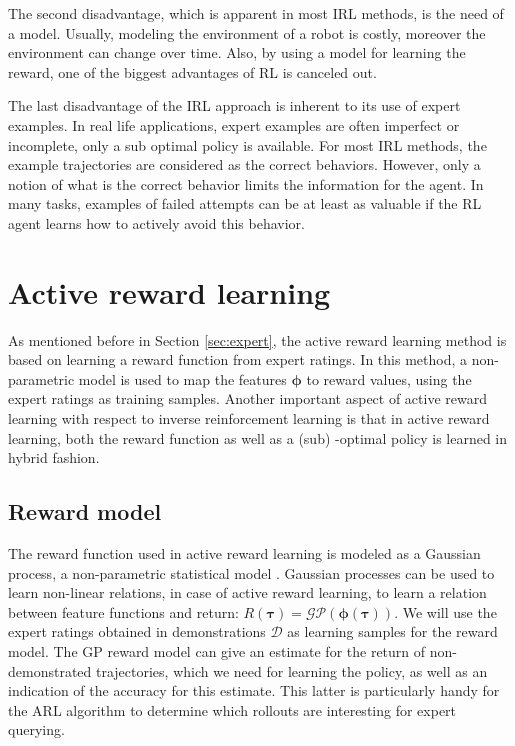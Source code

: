 \documentclass[mscThesis.tex]{subfiles}
\begin{document}
The second disadvantage, which is apparent in most IRL methods, is the need of a model. Usually, modeling the environment of a robot is costly, moreover the environment can change over time. Also, by using a model for learning the reward, one of the biggest advantages of RL is canceled out. 

The last disadvantage of the IRL approach is inherent to its use of expert examples. In real life applications, expert examples are often imperfect or incomplete, only a sub optimal policy is available. For most IRL methods, the example trajectories are considered as the correct behaviors. However, only a notion of what is the correct behavior limits the information for the agent. In many tasks, examples of failed attempts can be at least as valuable if the RL agent learns how to actively avoid this behavior. 


\section{Active reward learning}
\label{sec:arl}
As mentioned before in Section \ref{sec:expert}, the active reward learning method is based on learning a reward function from expert ratings. In this method, a non-parametric model is used to map the features $\bm{\phi}$ to reward values, using the expert ratings as training samples. Another important aspect of active reward learning with respect to inverse reinforcement learning is that in active reward learning, both the reward function as well as a (sub) -optimal policy is learned in hybrid fashion.

\subsection{Reward model}
The reward function used in active reward learning is modeled as a Gaussian process, a non-parametric statistical model \cite{rasmussen2006}. Gaussian processes can be used to learn non-linear relations, in case of active reward learning, to learn a relation between feature functions and return: $R( \bm{\tau} ) = \mathcal{GP}(\bm{\phi}(\bm{\tau}))$. We will use the expert ratings obtained in demonstrations $\mathcal{D}$ as learning samples for the reward model. The GP reward model can give an estimate for the return of non-demonstrated trajectories, which we need for learning the policy, as well as an indication of the accuracy for this estimate. This latter is particularly handy for the ARL algorithm to determine which rollouts are interesting for expert querying.
\end{document}
